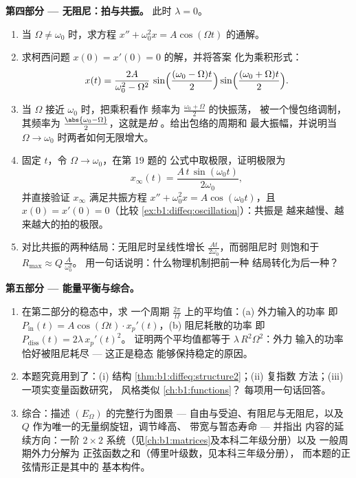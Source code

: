 \begin{problem}
\medskip
\noindent\textbf{第四部分 --- 无阻尼：拍与共振。}
此时 $\lambda = 0$。
\begin{enumerate}[resume]
  \item 当 $\Omega \neq \omega_0$ 时，求方程
        $x'' + \omega_0^2 x = A\cos(\Omega t)$ 的通解。
  \item 求柯西问题 $x(0) = x'(0) = 0$ 的解，并将答案
        化为乘积形式：
        \[
        x(t) = \frac{2A}{\omega_0^2 - \Omega^2}\,
        \sin\Bigl(\frac{(\omega_0 - \Omega)t}2\Bigr)
        \sin\Bigl(\frac{(\omega_0 + \Omega)t}2\Bigr) .
        \]
  \item 当 $\Omega$ 接近 $\omega_0$ 时，把乘积看作
        频率为 $\frac{\omega_0 + \Omega}2$ 的快振荡，
        被一个慢包络调制，其频率为
        $\frac{\abs{\omega_0 - \Omega}}2$，这就是\emph{拍}
        。给出包络的周期和
        最大振幅，并说明当 $\Omega
        \to \omega_0$ 时两者如何无限增大。
  \item 固定 $t$，令 $\Omega \to \omega_0$，在第 19 题的
        公式中取极限，证明极限为
        \[
        x_\infty(t) = \frac{A\,t\,\sin(\omega_0 t)}{2\omega_0} ,
        \]
        并直接验证 $x_\infty$ 满足共振方程
        $x'' + \omega_0^2 x = A\cos(\omega_0 t)$，且
        $x(0) = x'(0) = 0$（比较
        \cref{ex:b1:diffeq:oscillation}）：共振是
        越来越慢、越来越大的拍的极限。
  \item 对比共振的两种结局：无阻尼时呈线性增长
        $\frac{At}{2\omega_0}$，而弱阻尼时
        则饱和于 $R_{\max} \approx Q\,\frac{A}{\omega_0^2}$。
        用一句话说明：什么物理机制把前一种
        结局转化为后一种？
\end{enumerate}

\medskip
\noindent\textbf{第五部分 --- 能量平衡与综合。}
\begin{enumerate}[resume]
  \item 在第二部分的稳态中，求
        一个周期 $\frac{2\pi}\Omega$ 上的平均值：(a) 外力输入的功率
        即 $P_{\mathrm{in}}(t) = A\cos(\Omega t)
        \cdot x_p'(t)$，(b) 阻尼耗散的功率
        即 $P_{\mathrm{diss}}(t) = 2\lambda\,x_p'(t)^2$。
        证明两个平均值都等于 $\lambda\,R^2\Omega^2$：外力
        输入的功率恰好被阻尼耗尽 --- 这正是稳态
        能够保持稳定的原因。
  \item 本题究竟用到了：(i) 结构
        \cref{thm:b1:diffeq:structure2}；(ii) 复指数
        方法；(iii) 一项实变量函数研究，
        风格类似 \cref{ch:b1:functions}？
        每项用一句话回答。
  \item 综合：描述 $(E_\Omega)$ 的完整行为图景
        --- 自由与受迫、有阻尼与无阻尼，以及
        $Q$ 作为唯一的无量纲旋钮，调节峰高、
        带宽与暂态寿命 --- 并指出
        内容的延续方向：一阶 $2 \times 2$
        系统（见\cref{ch:b1:matrices}及本科二年级分册）以及
        一般周期外力分解为
        正弦函数之和（傅里叶级数，见本科三年级分册），
        而本题的正弦情形正是其中的
        基本构件。
\end{enumerate}
\end{problem}
